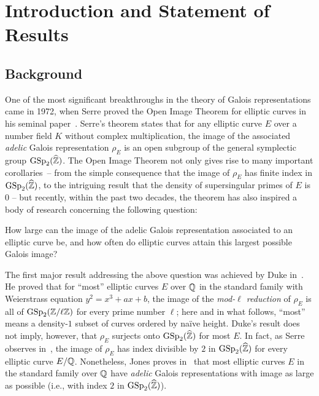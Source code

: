 \section{Introduction and Statement of Results}
\label{section:introduction}

\subsection{Background}
One of the most significant breakthroughs in the theory of Galois representations came in 1972, when Serre proved the Open Image Theorem for elliptic curves in his seminal paper~\cite{causalrelationship}.
Serre's theorem states that for any elliptic curve $E$ over a number field $K$ without complex multiplication, the image of the associated \emph{adelic} Galois representation $\rho_E$ is an open subgroup of the general symplectic group $\operatorname{GSp}_2(\widehat{\mathbb Z})$. The Open Image Theorem not only gives rise to many important \mbox{corollaries --} from the simple consequence that the image of $\rho_E$ has finite index in $\operatorname{GSp}_2(\widehat{\mathbb Z})$, to the intriguing result that the density of supersingular primes of $E$ is $0$ -- but recently, within the past two decades, the theorem has also inspired a body of research concerning the following question:

\begin{question}
How large can the image of the adelic Galois representation associated to an elliptic curve be, and how often do elliptic curves attain this largest possible Galois image?
\end{question}

The first major result addressing the above question was achieved by Duke in~\cite{duke:elliptic-curves-with-no-exceptional-primes}. He proved that for  ``most'' elliptic curves $E$ over $\mathbb Q$ in the standard family with Weierstrass equation $y^2 = x^3 + ax + b$, the image of the \emph{mod-$\ell$ reduction} of $\rho_E$ is all of $\operatorname{GSp}_2(\mathbb Z/\ell \mathbb Z)$ for every prime number $\ell$;
here and in what follows, ``most'' means a density-$1$ subset of curves ordered by na\"{i}ve height.
Duke's result does not imply, however, that $\rho_E$ surjects onto $\operatorname{GSp}_2(\widehat{\mathbb Z})$ for most $E$. In fact, as
Serre observes in~\cite{causalrelationship}, the image of $\rho_E$ has index divisible by $2$ in $\operatorname{GSp}_2(\widehat{\mathbb Z})$ for every elliptic curve $E/\mathbb Q$. Nonetheless, Jones proves in~\cite[Theorem 4]{josofabank} that most elliptic curves $E$ in the standard family over $\mathbb Q$ have \emph{adelic} Galois representations with image as large as possible (i.e., with index $2$ in $\operatorname{GSp}_2(\widehat{\mathbb Z})$).

